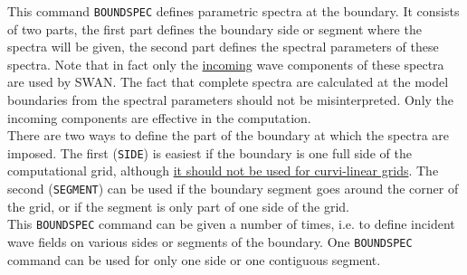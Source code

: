 \documentclass[12pt]{book}
\begin{document}
\noindent
This command {\tt BOUNDSPEC} defines parametric spectra at the boundary. It consists of two parts, the first
part defines the boundary side or segment where the spectra will be given, the second part defines the
spectral parameters of these spectra. Note that in fact only the \underline{incoming} wave components of these
spectra are used by SWAN. The fact that complete spectra are calculated at the model boundaries from
the spectral parameters should not be misinterpreted. Only the incoming components are effective in the
computation.
\\[2ex]
\noindent
There are two ways to define the part of the boundary at which the spectra are imposed. The first ({\tt SIDE})
is easiest if the boundary is one full side of the computational grid, although \underline{it should not be used for
curvi-linear grids}. The second ({\tt SEGMENT}) can be used if the boundary segment goes around the corner
of the grid, or if the segment is only part of one side of the grid.
\\[2ex]
\noindent
This {\tt BOUNDSPEC} command can be given a number of times, i.e. to define incident wave fields on
various sides or segments of the boundary. One {\tt BOUNDSPEC} command can be used for only one side
or one contiguous segment.
\end{document}

